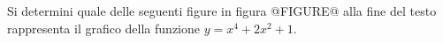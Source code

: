 Si determini quale delle seguenti figure in figura @FIGURE@ 
alla fine del testo rappresenta il grafico della funzione $y=x^4+2x^2+1$.

